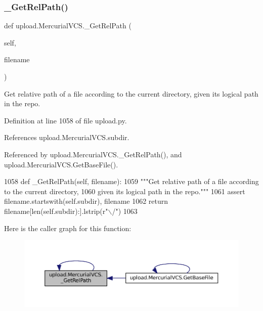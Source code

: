 \subsubsection{\texorpdfstring{\+\_\+\+Get\+Rel\+Path()}{\_GetRelPath()}\hspace{0.1cm}{\footnotesize\ttfamily [1/2]}}
{\footnotesize\ttfamily def upload.\+Mercurial\+V\+C\+S.\+\_\+\+Get\+Rel\+Path (\begin{DoxyParamCaption}\item[{}]{self,  }\item[{}]{filename }\end{DoxyParamCaption})\hspace{0.3cm}{\ttfamily [private]}}

\begin{DoxyVerb}Get relative path of a file according to the current directory,
given its logical path in the repo.\end{DoxyVerb}
 

Definition at line 1058 of file upload.\+py.



References upload.\+Mercurial\+V\+C\+S.\+subdir.



Referenced by upload.\+Mercurial\+V\+C\+S.\+\_\+\+Get\+Rel\+Path(), and upload.\+Mercurial\+V\+C\+S.\+Get\+Base\+File().


\begin{DoxyCode}
1058   \textcolor{keyword}{def }\_GetRelPath(self, filename):
1059     \textcolor{stringliteral}{"""Get relative path of a file according to the current directory,}
1060 \textcolor{stringliteral}{    given its logical path in the repo."""}
1061     \textcolor{keyword}{assert} filename.startswith(self.subdir), filename
1062     \textcolor{keywordflow}{return} filename[len(self.subdir):].lstrip(\textcolor{stringliteral}{r"\(\backslash\)/"})
1063 
\end{DoxyCode}
Here is the caller graph for this function\+:
\nopagebreak
\begin{figure}[H]
\begin{center}
\leavevmode
\includegraphics[width=350pt]{classupload_1_1MercurialVCS_a140da653b63106c4fa825f3ef5bf7701_icgraph}
\end{center}
\end{figure}
\mbox{\label{classupload_1_1MercurialVCS_a140da653b63106c4fa825f3ef5bf7701}} 
